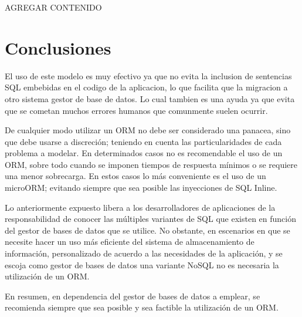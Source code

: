 \documentclass[preprint,12pt]{elsarticle}
\begin{document}
AGREGAR CONTENIDO



\section{Conclusiones}
El uso de este modelo es muy efectivo ya que no evita la inclusion de sentencias SQL embebidas en el codigo de la aplicacion, lo que facilita que la migracion a otro sistema gestor de base de datos. Lo cual tambien es una ayuda ya que evita que se cometan muchos errores humanos que comunmente suelen ocurrir.

De cualquier modo utilizar un ORM no debe ser considerado una panacea, sino que debe usarse a discreción; teniendo en cuenta las particularidades de cada problema a modelar. En determinados casos no es recomendable el uso de un ORM, sobre todo cuando se imponen tiempos de respuesta mínimos o se requiere una menor sobrecarga. En estos casos lo más conveniente es el uso de un microORM;
evitando siempre que sea posible las inyecciones de SQL Inline.

Lo anteriormente expuesto libera a los desarrolladores de aplicaciones de la responsabilidad de conocer las múltiples variantes de SQL que existen en función del gestor de bases de datos que se utilice. No obstante, en escenarios en que se necesite hacer un uso más eficiente del sistema de almacenamiento de información, personalizado de acuerdo a las necesidades de la aplicación, y se escoja como gestor de bases de datos una variante NoSQL no es necesaria la utilización de un ORM.

En resumen, en dependencia del gestor de bases de datos a emplear, se recomienda siempre que sea posible y sea factible la utilización de un ORM.	


	
	

	
	\newpage
	
		 

    

	
\end{document}
